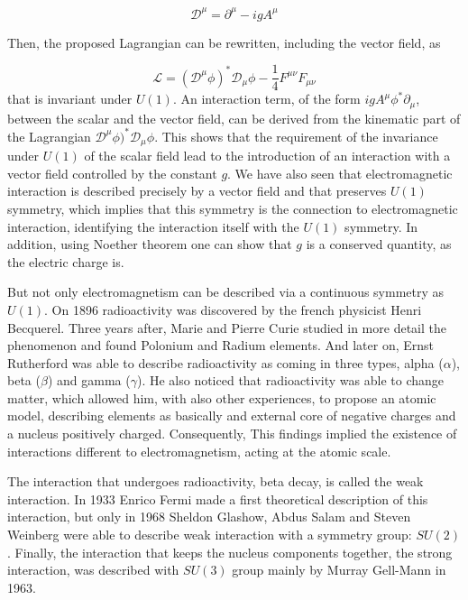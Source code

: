 \begin{equation}
  \label{eq:covderivU1}
  \mathcal{D}^{\mu}=\partial^{\mu}-igA^{\mu}
\end{equation}

Then, the proposed Lagrangian can be rewritten, including the vector field, as

\begin{equation}
  \label{eq:FullLagU1inv}
  \mathcal{L}=(\mathcal{D}^{\mu}\phi)^{*}\mathcal{D}_{\mu}\phi-\frac{1}{4}F^{\mu\nu}F_{\mu\nu}
\end{equation}that is invariant under $U(1)$. An interaction term, of the form $igA^{\mu}\phi^{*}\partial_{\mu}$, between the scalar and the vector field, can be derived from the kinematic part of the Lagrangian $\mathcal{D}^{\mu}\phi)^{*}\mathcal{D}_{\mu}\phi$. This shows that the requirement of the invariance under $U(1)$ of the scalar field lead to the introduction of an interaction with a vector field controlled by the constant $g$. We have also seen that electromagnetic interaction is described precisely by a vector field and that preserves $U(1)$ symmetry, which implies that this symmetry is the connection to electromagnetic interaction, identifying the interaction itself with the $U(1)$ symmetry. In addition, using Noether theorem one can show that $g$ is a conserved quantity, as the electric charge is.

But not only electromagnetism can be described via a continuous symmetry as $U(1)$. On 1896 radioactivity was discovered by the french physicist Henri Becquerel. Three years after, Marie and Pierre Curie studied in more detail the phenomenon and found Polonium and Radium elements. And later on, Ernst Rutherford was able to describe radioactivity as coming in three types, alpha ($\alpha$), beta ($\beta$) and gamma ($\gamma$). He also noticed that radioactivity was able to change matter, which allowed him, with also other experiences, to propose an atomic model, describing elements as basically and external core of negative charges and a nucleus positively charged. Consequently, This findings implied the existence of interactions different to electromagnetism, acting at the atomic scale.

The interaction that undergoes radioactivity, beta decay, is called the weak interaction. In 1933 Enrico Fermi made a first theoretical description of this interaction, but only in 1968 Sheldon Glashow, Abdus Salam and Steven Weinberg were able to describe weak interaction with a symmetry group: $SU(2)$. Finally, the interaction that keeps the nucleus components together, the strong interaction, was described with $SU(3)$ group mainly by Murray Gell-Mann in 1963.


